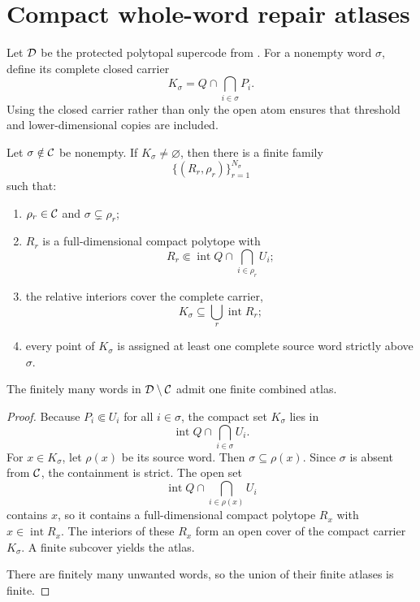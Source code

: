 \section{Compact whole-word repair atlases}
\label{sec:repair-atlases}

Let $\mathcal D$ be the protected polytopal supercode from .  For a nonempty word $\sigma$, define its complete closed carrier
\[
 K_\sigma=Q\cap\bigcap_{i\in\sigma}P_i.
\]
Using the closed carrier rather than only the open atom ensures that threshold and lower-dimensional copies are included.

\begin{theorem}
\label{thm:repair-atlas}
Let $\sigma\notin\mathcal C$ be nonempty.  If $K_\sigma\ne\varnothing$, then there is a finite family
\[
 \{(R_r,\rho_r)\}_{r=1}^{N_\sigma}
\]
such that:
\begin{enumerate}[label=\textup{(\roman*)}]
\item $\rho_r\in\mathcal C$ and $\sigma\subsetneq\rho_r$;
\item $R_r$ is a full-dimensional compact polytope with
\[
 R_r\Subset\operatorname{int}Q\cap\bigcap_{i\in\rho_r}U_i;
\]
\item the relative interiors cover the complete carrier,
\[
 K_\sigma\subseteq\bigcup_r\operatorname{int}R_r;
\]
\item every point of $K_\sigma$ is assigned at least one complete source word strictly above $\sigma$.
\end{enumerate}
The finitely many words in $\mathcal D\setminus\mathcal C$ admit one finite combined atlas.
\end{theorem}

\begin{proof}
Because $P_i\Subset U_i$ for all $i\in\sigma$, the compact set $K_\sigma$ lies in
\[
 \operatorname{int}Q\cap\bigcap_{i\in\sigma}U_i.
\]
For $x\in K_\sigma$, let $\rho(x)$ be its source word.  Then $\sigma\subseteq\rho(x)$.  Since $\sigma$ is absent from $\mathcal C$, the containment is strict.  The open set
\[
 \operatorname{int}Q\cap\bigcap_{i\in\rho(x)}U_i
\]
contains $x$, so it contains a full-dimensional compact polytope $R_x$ with $x\in\operatorname{int}R_x$.  The interiors of these $R_x$ form an open cover of the compact carrier $K_\sigma$.  A finite subcover yields the atlas.

There are finitely many unwanted words, so the union of their finite atlases is finite.
\end{proof}

